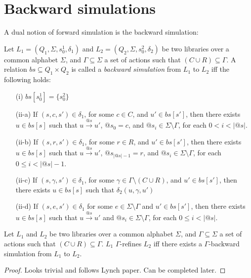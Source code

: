 \section{Backward simulations}\label{app:backSim}

A dual notion of forward simulation is the backward simulation:
\begin{dfn}
Let $L_1=(Q_1,\Sigma, s_0^1, \delta_1)$ and $L_2=(Q_2,\Sigma, s_0^2, \delta_2)$ be two libraries over a common alphabet $\Sigma$, and $\Gamma\subseteq \Sigma$ a set of actions such that $(C\cup R)\subseteq \Gamma$. A relation $bs \subseteq Q_1 \times Q_2$ is called a \emph{backward simulation} from $L_1$ to $L_2$ iff the following holds:
\begin{itemize}
\item[(i)] $bs[s_0^1] = \{s_0^2 \}$
\item[(ii-a)] If $(s,c,s') \in \delta_1$, for some $c\in C$, and $u' \in bs[s']$, then there exists $u \in bs[s]$ such that $u \xrightarrow{@s} u'$, $@s_0=c$, and $@s_i\in \Sigma\setminus\Gamma$, for each $0<i<|@s|$.
\item[(ii-b)] If $(s,r,s') \in \delta_1$, for some $r\in R$, and $u' \in bs[s']$, then there exists $u \in bs[s]$ such that $u \xrightarrow{@s} u'$, $@s_{|@s| -1}=r$, and $@s_i\in \Sigma\setminus\Gamma$, for each $0\leq i<|@s| -1$.
\item[(ii-c)] If $(s,\gamma, s') \in \delta_1$, for some $\gamma\in \Gamma\setminus (C\cup R)$, and $u' \in bs[s']$, then there exists $u \in bs[s]$ such that $\delta_2(u,\gamma,u')$
\item[(ii-d)] If $(s,e,s') \in \delta_1$ for some $e \in \Sigma\setminus \Gamma$ and $u' \in bs[s']$, then there exists $u \in bs[s]$ such that $u \xrightarrow{@s} u'$ and $@s_i\in \Sigma\setminus\Gamma$, for each $0\leq i<|@s|$.
\end{itemize}
\end{dfn}

\begin{lem}
Let $L_1$ and $L_2$ be two libraries over a common alphabet $\Sigma$, and $\Gamma\subseteq \Sigma$ a set of actions such that $(C\cup R)\subseteq \Gamma$. $L_1$ $\Gamma$-refines $L_2$ if{f} there exists a $\Gamma$-backward simulation from $L_1$ to $L_2$.
\end{lem}
\begin{proof}
Looks trivial and follows Lynch paper. Can be completed later.
\end{proof}

